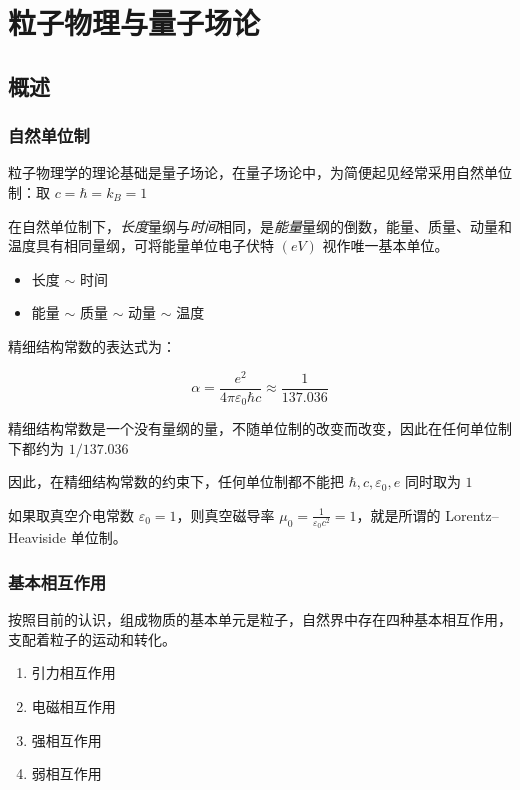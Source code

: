 \chapter{粒子物理与量子场论}

\section{概述}

\subsection{自然单位制}

粒子物理学的理论基础是量子场论，在量子场论中，为简便起见经常采用自然单位制：取 $c=\hbar=k_B=1$

在自然单位制下，\emph{长度}量纲与\emph{时间}相同，是\emph{能量}量纲的倒数，能量、质量、动量和温度具有相同量纲，可将能量单位电子伏特 $(\unit{eV})$ 视作唯一基本单位。

\begin{itemize}
    \item 长度 $\sim$ 时间
    \item 能量 $\sim$ 质量 $\sim$ 动量 $\sim$ 温度
\end{itemize}

精细结构常数的表达式为：

\begin{equation}
    \alpha = \frac{e^2}{4 \pi \varepsilon_0 \hbar c} \approx \frac{1}{137.036}
\end{equation}

精细结构常数是一个没有量纲的量，不随单位制的改变而改变，因此在任何单位制下都约为 $1/137.036$

因此，在精细结构常数的约束下，任何单位制都不能把 $\hbar,c,\varepsilon_0,e$ 同时取为 $1$

如果取真空介电常数 $\varepsilon_0=1$，则真空磁导率 $\mu_0=\frac{1}{\varepsilon_0 c^2}=1$，就是所谓的 Lorentz–Heaviside 单位制。


\subsection{基本相互作用}

按照目前的认识，组成物质的基本单元是粒子，自然界中存在四种基本相互作用，支配着粒子的运动和转化。

\begin{enumerate}
    \item 引力相互作用
    \item 电磁相互作用
    \item 强相互作用
    \item 弱相互作用
\end{enumerate}

